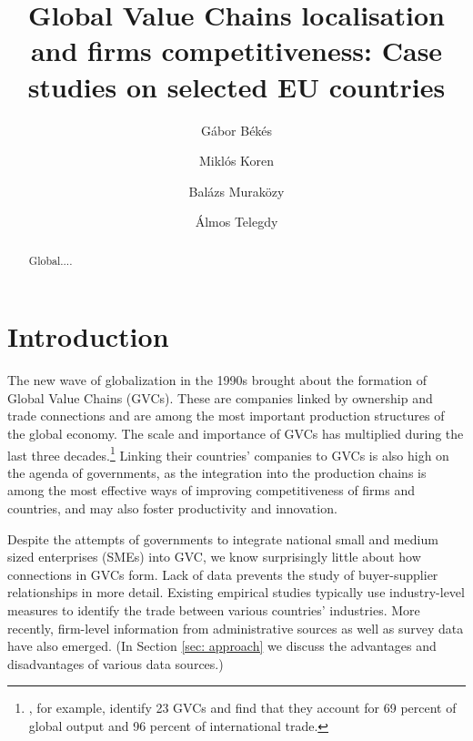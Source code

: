 \documentclass[final, dvipsnames, authoryear,12pt]{elsarticle}
\begin{document}
\begin{frontmatter}
\title{Global Value Chains localisation and firms competitiveness: Case studies on selected EU countries}






\author[gb]{G\'{a}bor B\'{e}k\'{e}s}
\author[mk]{Miklós Koren}
\author[bm]{Balázs Muraközy}
\author[at]{Álmos Telegdy}
 \address[gb]{Central European University, Institute of Economics and CEPR}
 \address[mk]{Central European University, Institute of Economics and CEPR}
 \address[bm]{University of Liverpool, Institute of Economics }
 \address[at]{National Bank of Hungary}
 
 




\begin{abstract}
    Global....
\end{abstract}


\end{frontmatter}

\section{Introduction}

The new wave of globalization in the 1990s brought about the formation of Global Value Chains (GVCs). These are companies linked by ownership and trade connections and are among the most important production structures of the global economy. The scale and importance of GVCs has multiplied during the last three decades.\footnote{\cite{mckinsey2019gvc}, for example, identify 23 GVCs and find that they account for 69 percent of global output and 96 percent of international trade.} Linking their countries' companies to GVCs is also high on the agenda of governments, as the integration into the production chains is among the most effective ways of improving competitiveness of firms and countries, and may also foster productivity and innovation.

Despite the attempts of governments to integrate national small and medium sized enterprises (SMEs) into GVC, we know surprisingly little about how connections in GVCs form. Lack of data prevents the study of buyer-supplier relationships in more detail. Existing empirical studies typically use industry-level measures to identify the trade between various countries' industries. More recently, firm-level information from administrative sources as well as survey data have also emerged. (In Section \ref{sec: approach} we discuss the advantages and disadvantages of various data sources.)
\end{document}

